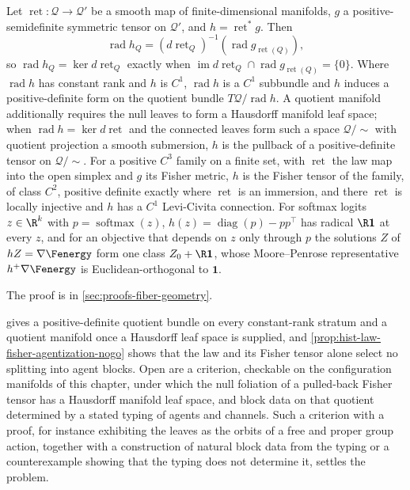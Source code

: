 Let $\operatorname{ret}:\mathcal Q\to\mathcal Q'$ be a smooth map of finite-dimensional
manifolds, $g$ a positive-semidefinite symmetric tensor on $\mathcal Q'$, and
$h=\operatorname{ret}^*g$.  Then
\begin{equation}
\operatorname{rad}h_Q
=(d\operatorname{ret}_Q)^{-1}\left(\operatorname{rad}g_{\operatorname{ret}(Q)}\right),
\label{eq:hist-cds-fisher-radical}
\end{equation}
so $\operatorname{rad}h_Q=\ker d\operatorname{ret}_Q$ exactly when
$\operatorname{im}d\operatorname{ret}_Q\cap\operatorname{rad}g_{\operatorname{ret}(Q)}
=\{0\}$.  Where $\operatorname{rad}h$ has constant rank and $h$ is $C^1$,
$\operatorname{rad}h$ is a $C^1$ subbundle and $h$ induces a positive-definite form on
the quotient bundle $T\mathcal Q/\operatorname{rad}h$.  A quotient manifold additionally
requires the null leaves to form a Hausdorff manifold leaf space; when
$\operatorname{rad}h=\ker d\operatorname{ret}$ and the connected leaves form such a space
$\mathcal Q/{\sim}$ with quotient projection a smooth submersion, $h$ is the pullback of a positive-definite tensor on
$\mathcal Q/{\sim}$.  For a positive $C^3$ family on a finite set, with
$\operatorname{ret}$ the law map into the open simplex and $g$ its Fisher metric, $h$ is
the Fisher tensor of the family, of class $C^2$, positive definite exactly where
$\operatorname{ret}$ is an immersion, and there $\operatorname{ret}$ is locally
injective and $h$ has a $C^1$ Levi-Civita connection.  For softmax logits $z\in\R^k$
with $p=\operatorname{softmax}(z)$, $h(z)=\operatorname{diag}(p)-pp^\top$ has radical
$\R\mathbf 1$ at every $z$, and for an objective that depends on $z$ only through $p$
the solutions $Z$ of $hZ=\nabla\Fenergy$ form one class $Z_0+\R\mathbf 1$, whose
Moore--Penrose representative $h^+\nabla\Fenergy$ is Euclidean-orthogonal to
$\mathbf 1$.  

The proof is in \cref{sec:proofs-fiber-geometry}.

 gives a positive-definite quotient bundle on
every constant-rank stratum and a quotient manifold once a Hausdorff leaf space is
supplied, and \cref{prop:hist-law-fisher-agentization-nogo} shows that the law and its
Fisher tensor alone select no splitting into agent blocks.  Open are a criterion,
checkable on the configuration manifolds of this chapter, under which the null foliation
of a pulled-back Fisher tensor has a Hausdorff manifold leaf space, and block data on
that quotient determined by a stated typing of agents and channels.  Such a criterion
with a proof, for instance exhibiting the leaves as the orbits of a free and proper group
action, together with a construction of natural block data from the typing or a
counterexample showing that the typing does not determine it, settles the problem.

